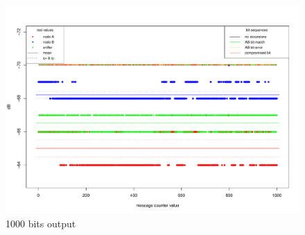 \documentclass[
  print, %
  Table,   %
  nolof,     %
  nolot,     %
           oneside
]{fithesis3}
\begin{document}
\begin{figure}
  \includegraphics[height=\textwidth, angle = 90 ]{../images/graph_rssi_03.pdf}
\caption{1000 bits output}
\label{fig:rssi_03}
\end{figure}
\end{document}
